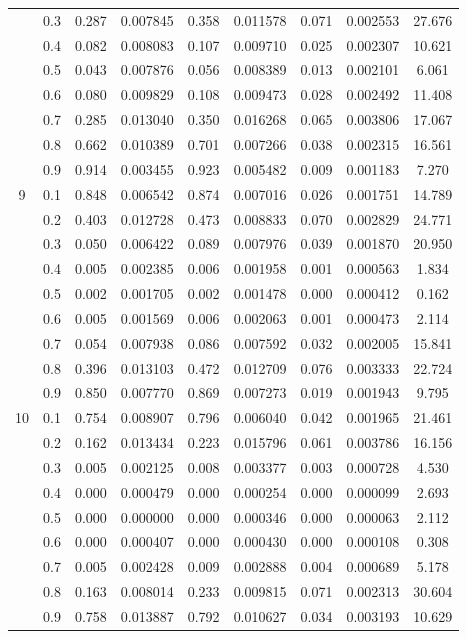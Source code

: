 \begin{longtable}{ | c | c || c | c | c | c | c | c | c | }
 & 0.3 & 0.287 & 0.007845 & 0.358 & 0.011578 & 0.071 & 0.002553 & 27.676 \\
 & 0.4 & 0.082 & 0.008083 & 0.107 & 0.009710 & 0.025 & 0.002307 & 10.621 \\
 & 0.5 & 0.043 & 0.007876 & 0.056 & 0.008389 & 0.013 & 0.002101 & 6.061 \\
 & 0.6 & 0.080 & 0.009829 & 0.108 & 0.009473 & 0.028 & 0.002492 & 11.408 \\
 & 0.7 & 0.285 & 0.013040 & 0.350 & 0.016268 & 0.065 & 0.003806 & 17.067 \\
 & 0.8 & 0.662 & 0.010389 & 0.701 & 0.007266 & 0.038 & 0.002315 & 16.561 \\
 & 0.9 & 0.914 & 0.003455 & 0.923 & 0.005482 & 0.009 & 0.001183 & 7.270 \\
 \hline
\multirow{9}{*}{9} & 0.1 & 0.848 & 0.006542 & 0.874 & 0.007016 & 0.026 & 0.001751 & 14.789 \\
 & 0.2 & 0.403 & 0.012728 & 0.473 & 0.008833 & 0.070 & 0.002829 & 24.771 \\
 & 0.3 & 0.050 & 0.006422 & 0.089 & 0.007976 & 0.039 & 0.001870 & 20.950 \\
 & 0.4 & 0.005 & 0.002385 & 0.006 & 0.001958 & 0.001 & 0.000563 & 1.834 \\
 & 0.5 & 0.002 & 0.001705 & 0.002 & 0.001478 & 0.000 & 0.000412 & 0.162 \\
 & 0.6 & 0.005 & 0.001569 & 0.006 & 0.002063 & 0.001 & 0.000473 & 2.114 \\
 & 0.7 & 0.054 & 0.007938 & 0.086 & 0.007592 & 0.032 & 0.002005 & 15.841 \\
 & 0.8 & 0.396 & 0.013103 & 0.472 & 0.012709 & 0.076 & 0.003333 & 22.724 \\
 & 0.9 & 0.850 & 0.007770 & 0.869 & 0.007273 & 0.019 & 0.001943 & 9.795 \\
 \hline
\multirow{9}{*}{10} & 0.1 & 0.754 & 0.008907 & 0.796 & 0.006040 & 0.042 & 0.001965 & 21.461 \\
 & 0.2 & 0.162 & 0.013434 & 0.223 & 0.015796 & 0.061 & 0.003786 & 16.156 \\
 & 0.3 & 0.005 & 0.002125 & 0.008 & 0.003377 & 0.003 & 0.000728 & 4.530 \\
 & 0.4 & 0.000 & 0.000479 & 0.000 & 0.000254 & 0.000 & 0.000099 & 2.693 \\
 & 0.5 & 0.000 & 0.000000 & 0.000 & 0.000346 & 0.000 & 0.000063 & 2.112 \\
 & 0.6 & 0.000 & 0.000407 & 0.000 & 0.000430 & 0.000 & 0.000108 & 0.308 \\
 & 0.7 & 0.005 & 0.002428 & 0.009 & 0.002888 & 0.004 & 0.000689 & 5.178 \\
 & 0.8 & 0.163 & 0.008014 & 0.233 & 0.009815 & 0.071 & 0.002313 & 30.604 \\
 & 0.9 & 0.758 & 0.013887 & 0.792 & 0.010627 & 0.034 & 0.003193 & 10.629 \\
 \hline
\hline
\end{longtable}
 
